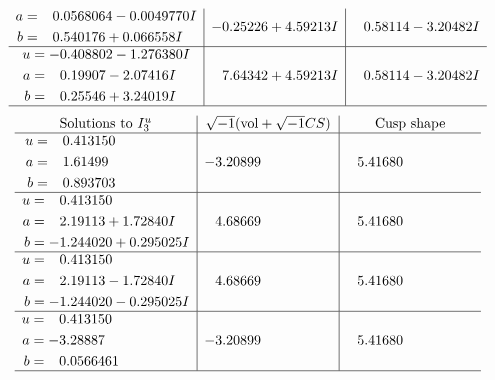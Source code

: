 \documentclass[1p]{elsarticle_modified}
\theoremstyle{definition}
\newcommand{\I}{\sqrt{-1}}
\begin{document}
$$\begin{array}{c|c|c}
\begin{aligned}
a &= \phantom{-}0.0568064 - 0.0049770 I \\
b &= \phantom{-}0.540176 + 0.066558 I\end{aligned}
 & -0.25226 + 4.59213 I & \phantom{-}0.58114 - 3.20482 I \\ \hline\begin{aligned}
u &= -0.408802 - 1.276380 I \\
a &= \phantom{-}0.19907 - 2.07416 I \\
b &= \phantom{-}0.25546 + 3.24019 I\end{aligned}
 & \phantom{-}7.64342 + 4.59213 I & \phantom{-}0.58114 - 3.20482 I\\
 \hline 
 \end{array}$$\newpage$$\begin{array}{c|c|c}  
\text{Solutions to }I^u_{3}& \I (\text{vol} + \sqrt{-1}CS) & \text{Cusp shape}\\
 \hline 
\begin{aligned}
u &= \phantom{-}0.413150\phantom{ +0.000000I} \\
a &= \phantom{-}1.61499\phantom{ +0.000000I} \\
b &= \phantom{-}0.893703\phantom{ +0.000000I}\end{aligned}
 & -3.20899\phantom{ +0.000000I} & \phantom{-}5.41680\phantom{ +0.000000I} \\ \hline\begin{aligned}
u &= \phantom{-}0.413150\phantom{ +0.000000I} \\
a &= \phantom{-}2.19113 + 1.72840 I \\
b &= -1.244020 + 0.295025 I\end{aligned}
 & \phantom{-}4.68669\phantom{ +0.000000I} & \phantom{-}5.41680\phantom{ +0.000000I} \\ \hline\begin{aligned}
u &= \phantom{-}0.413150\phantom{ +0.000000I} \\
a &= \phantom{-}2.19113 - 1.72840 I \\
b &= -1.244020 - 0.295025 I\end{aligned}
 & \phantom{-}4.68669\phantom{ +0.000000I} & \phantom{-}5.41680\phantom{ +0.000000I} \\ \hline\begin{aligned}
u &= \phantom{-}0.413150\phantom{ +0.000000I} \\
a &= -3.28887\phantom{ +0.000000I} \\
b &= \phantom{-}0.0566461\phantom{ +0.000000I}\end{aligned}
 & -3.20899\phantom{ +0.000000I} & \phantom{-}5.41680\phantom{ +0.000000I}\\
 \hline 
 \end{array}$$\newpage
\end{document}
